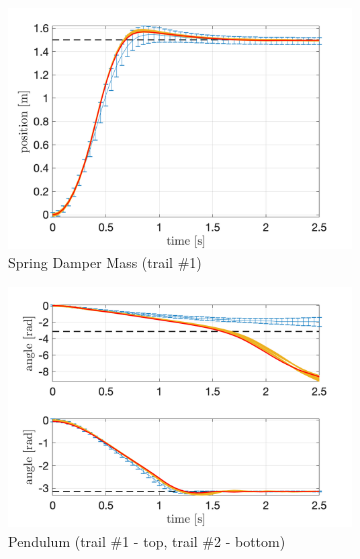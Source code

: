 \documentclass[letterpaper, 10 pt, conference]{ieeeconf}  %
\begin{document}
\begin{figure}[!thp] 
	\centering
	\begin{subfigure}{0.325\textwidth}
	\includegraphics[width=\textwidth]{sdm_quad.png}
	\caption{Spring Damper Mass (trail \#1)\newline}\label{fig:PILCO_sdm}
	\end{subfigure}
	\begin{subfigure}{0.325\textwidth}
	\includegraphics[width=\textwidth]{pend_quad.png}
	\caption{Pendulum (trail \#1 - top, trail \#2 - bottom)\newline}\label{fig:PILCO_pendulum}
	\end{subfigure}
	\begin{subfigure}{0.325\textwidth}

\end{subfigure}
\end{figure}
\end{document}
